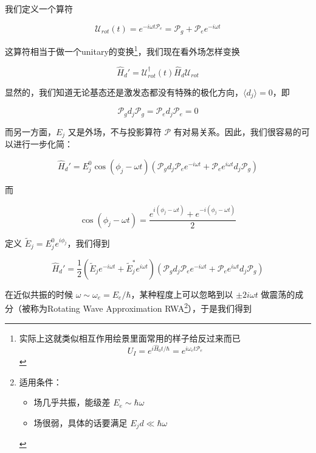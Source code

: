 我们定义一个算符

\begin{equation}
\mathcal{U}_{rot}(t) = e^{-i\omega t\mathcal{P}_e} = \mathcal{P}_g + \mathcal{P}_e e^{-i\omega t}
\end{equation}

这算符相当于做一个unitary的变换\footnote{实际上这就类似相互作用绘景里面常用的样子给反过来而已
\begin{equation}
U_I = e^{i\hat{H}_0t/\hbar} = e^{i\omega_e t\mathcal{P}_e}
\end{equation}
}，我们现在看外场怎样变换

\begin{equation}
\hat{H}_d' = \mathcal{U}_{rot}^\dagger(t)\hat{H}_d \mathcal{U}_{rot}
\end{equation}

显然的，我们知道无论基态还是激发态都没有特殊的极化方向，$\langle d_j \rangle = 0$，即

\begin{equation}
\mathcal{P}_g d_j \mathcal{P}_g = \mathcal{P}_e d_j \mathcal{P}_e = 0
\end{equation}

而另一方面，$E_j$ 又是外场，不与投影算符 $\mathcal{P}$ 有对易关系。因此，我们很容易的可以进行一步化简：

\begin{equation}
\hat{H}_d' = E_j^0\cos(\phi_j-\omega t) (\mathcal{P}_g d_j \mathcal{P}_e e^{-i\omega t} + \mathcal{P}_e e^{i\omega t} d_j \mathcal{P}_g)
\end{equation}

而

\begin{equation}
\cos(\phi_j - \omega t) = \frac{e^{i(\phi_j-\omega t)} + e^{-i(\phi_j-\omega t)}}{2}
\end{equation}

定义 $\tilde{E}_j = E_j^0 e^{i\phi_j}$，我们得到

\begin{equation}
\hat{H}_d' = \frac{1}{2}\left(\tilde{E}_j e^{-i\omega t} + \tilde{E}_j^* e^{i\omega t}\right) (\mathcal{P}_g d_j \mathcal{P}_e e^{-i\omega t} + \mathcal{P}_e e^{i\omega t} d_j \mathcal{P}_g)
\end{equation}

在近似共振的时候 $\omega\sim\omega_e = E_e/\hbar$，某种程度上可以忽略到以 $\pm 2i\omega t$ 做震荡的成分（被称为Rotating Wave Approximation RWA\footnote{适用条件：\\
\begin{itemize}\item 场几乎共振，能级差 $E_e \sim \hbar \omega$\\
\item 场很弱，具体的话要满足 $E_j d \ll \hbar\omega$ \end{itemize}}），于是我们得到

